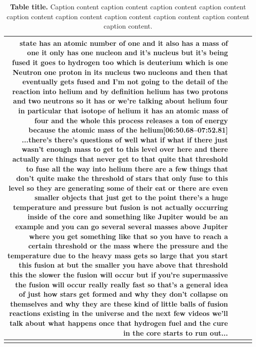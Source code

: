 \documentclass[10pt]{article}
\begin{document}
\begin{tiny}
\begin{longtable}{|r|p{0.375in}|p{1.275in}|p{3.5in}|}
state has an atomic number of one and it also has a mass of one it only has one nucleon and it's nucleus but it's being fused it goes to hydrogen too which is deuterium which is one Neutron one proton in its nucleus two nucleons and then that eventually gets fused and I'm not going to the detail of the reaction into helium and by definition helium has two protons and two neutrons so it has or we're talking about helium four in particular that isotope of helium it has an atomic mass of four and the whole this process releases a ton of energy because the atomic mass of the helium\newline\textbf{[06:50.68--07:52.81]} ...there's there's questions of well what if what if there just wasn't enough mass to get to this level over here and there actually are things that never get to that quite that threshold to fuse all the way into helium there are a few things that don't quite make the threshold of stars that only fuse to this level so they are generating some of their eat or there are even smaller objects that just get to the point there's a huge temperature and pressure but fusion is not actually occurring inside of the core and something like Jupiter would be an example and you can go several several masses above Jupiter where you get something like that so you have to reach a certain threshold or the mass where the pressure and the temperature due to the heavy mass gets so large that you start this fusion at but the smaller you have above that threshold this the slower the fusion will occur but if you're supermassive the fusion will occur really really fast so that's a general idea of just how stars get formed and why they don't collapse on themselves and why they are these kind of little balls of fusion reactions existing in the universe and the next few videos we'll talk about what happens once that hydrogen fuel and the cure in the core starts to run out... \\\hline

    \caption{\textbf{Table title.} Caption content caption content caption content caption content caption content caption content caption content caption content caption content caption content.}
    \end{longtable}
\end{tiny}
\end{document}
